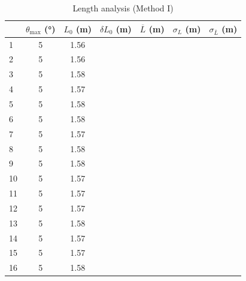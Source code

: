 \documentclass[11pt,a4paper]{article}
\newcommand{\head}[1]{\textcolor{calpolypomonagreen}{#1}}
\begin{document}
\begin{table}[H]
  \centering
  \small
  \begin{tabular}{lcccccc}
    \toprule[0.7mm]
      & \head{$\theta_{\max}$ (\unit{\degree})}
      & \head{$L_0$ (\unit{\m})}
      & \head{$\delta L_0$ (\unit{\m})}
      & \head{$\overline{L}$ (\unit{\m})}
      & \head{$\sigma_L$ (\unit{\m})}
      & \head{$\sigma_{\overline{L}}$ (\unit{\m})} \\
    \midrule
      1  & 5 & 1.56 & & & & \\
      2  & 5 & 1.56 & & & & \\
      3  & 5 & 1.58 & & & & \\
      4  & 5 & 1.57 & & & & \\
      5  & 5 & 1.58 & & & & \\
      6  & 5 & 1.58 & & & & \\
      7  & 5 & 1.57 & & & & \\
      8  & 5 & 1.58 & & & & \\
      9  & 5 & 1.58 & & & & \\
      10 & 5 & 1.57 & & & & \\
      11 & 5 & 1.57 & & & & \\
      12 & 5 & 1.57 & & & & \\
      13 & 5 & 1.58 & & & & \\
      14 & 5 & 1.57 & & & & \\
      15 & 5 & 1.57 & & & & \\
      16 & 5 & 1.58 & & & & \\
    \bottomrule[0.7mm]
  \end{tabular}
  \caption{Length analysis (Method I)}
  \label{tab:1}
\end{table}
\end{document}
